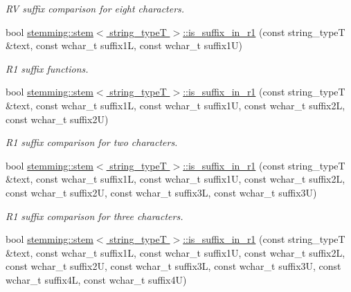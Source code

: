 \begin{DoxyCompactItemize}
\begin{DoxyCompactList}\small\item\em R\-V suffix comparison for eight characters. \end{DoxyCompactList}\item 
bool \hyperlink{group___stemming_gaefe544e653b27bd5c1fab7b5a18d80a1}{stemming\-::stem$<$ string\-\_\-type\-T $>$\-::is\-\_\-suffix\-\_\-in\-\_\-r1} (const string\-\_\-type\-T \&text, const wchar\-\_\-t suffix1\-L, const wchar\-\_\-t suffix1\-U)
\begin{DoxyCompactList}\small\item\em R1 suffix functions. \end{DoxyCompactList}\item 
\hypertarget{group___stemming_gab8cb2e00b39091f74b1064e1f0314c6f}{bool \hyperlink{group___stemming_gab8cb2e00b39091f74b1064e1f0314c6f}{stemming\-::stem$<$ string\-\_\-type\-T $>$\-::is\-\_\-suffix\-\_\-in\-\_\-r1} (const string\-\_\-type\-T \&text, const wchar\-\_\-t suffix1\-L, const wchar\-\_\-t suffix1\-U, const wchar\-\_\-t suffix2\-L, const wchar\-\_\-t suffix2\-U)}\label{group___stemming_gab8cb2e00b39091f74b1064e1f0314c6f}

\begin{DoxyCompactList}\small\item\em R1 suffix comparison for two characters. \end{DoxyCompactList}\item 
\hypertarget{group___stemming_ga1fe4a63adfa5d4f378a060352d52edc1}{bool \hyperlink{group___stemming_ga1fe4a63adfa5d4f378a060352d52edc1}{stemming\-::stem$<$ string\-\_\-type\-T $>$\-::is\-\_\-suffix\-\_\-in\-\_\-r1} (const string\-\_\-type\-T \&text, const wchar\-\_\-t suffix1\-L, const wchar\-\_\-t suffix1\-U, const wchar\-\_\-t suffix2\-L, const wchar\-\_\-t suffix2\-U, const wchar\-\_\-t suffix3\-L, const wchar\-\_\-t suffix3\-U)}\label{group___stemming_ga1fe4a63adfa5d4f378a060352d52edc1}

\begin{DoxyCompactList}\small\item\em R1 suffix comparison for three characters. \end{DoxyCompactList}\item 
\hypertarget{group___stemming_ga3fef2f8916933fa1965928f8e43a1b58}{bool \hyperlink{group___stemming_ga3fef2f8916933fa1965928f8e43a1b58}{stemming\-::stem$<$ string\-\_\-type\-T $>$\-::is\-\_\-suffix\-\_\-in\-\_\-r1} (const string\-\_\-type\-T \&text, const wchar\-\_\-t suffix1\-L, const wchar\-\_\-t suffix1\-U, const wchar\-\_\-t suffix2\-L, const wchar\-\_\-t suffix2\-U, const wchar\-\_\-t suffix3\-L, const wchar\-\_\-t suffix3\-U, const wchar\-\_\-t suffix4\-L, const wchar\-\_\-t suffix4\-U)}\label{group___stemming_ga3fef2f8916933fa1965928f8e43a1b58}


\end{DoxyCompactItemize}
